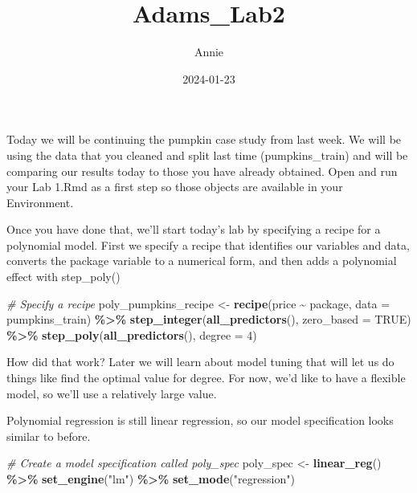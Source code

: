 \documentclass[
]{article}
\title{Adams\_Lab2}
\author{Annie}
\date{2024-01-23}
\newenvironment{Shaded}{\begin{snugshade}}{\end{snugshade}}
\newcommand{\AttributeTok}[1]{\textcolor[rgb]{0.13,0.29,0.53}{#1}}
\newcommand{\CommentTok}[1]{\textcolor[rgb]{0.56,0.35,0.01}{\textit{#1}}}
\newcommand{\ConstantTok}[1]{\textcolor[rgb]{0.56,0.35,0.01}{#1}}
\newcommand{\DecValTok}[1]{\textcolor[rgb]{0.00,0.00,0.81}{#1}}
\newcommand{\FunctionTok}[1]{\textcolor[rgb]{0.13,0.29,0.53}{\textbf{#1}}}
\newcommand{\NormalTok}[1]{#1}
\newcommand{\OtherTok}[1]{\textcolor[rgb]{0.56,0.35,0.01}{#1}}
\newcommand{\SpecialCharTok}[1]{\textcolor[rgb]{0.81,0.36,0.00}{\textbf{#1}}}
\newcommand{\StringTok}[1]{\textcolor[rgb]{0.31,0.60,0.02}{#1}}
\begin{document}
\maketitle

Today we will be continuing the pumpkin case study from last week. We
will be using the data that you cleaned and split last time
(pumpkins\_train) and will be comparing our results today to those you
have already obtained. Open and run your Lab 1.Rmd as a first step so
those objects are available in your Environment.

Once you have done that, we'll start today's lab by specifying a recipe
for a polynomial model. First we specify a recipe that identifies our
variables and data, converts the package variable to a numerical form,
and then adds a polynomial effect with step\_poly()

\begin{Shaded}
\begin{Highlighting}[]
\CommentTok{\# Specify a recipe}
\NormalTok{poly\_pumpkins\_recipe }\OtherTok{\textless{}{-}}
  \FunctionTok{recipe}\NormalTok{(price }\SpecialCharTok{\textasciitilde{}}\NormalTok{ package, }\AttributeTok{data =}\NormalTok{ pumpkins\_train) }\SpecialCharTok{\%\textgreater{}\%}
  \FunctionTok{step\_integer}\NormalTok{(}\FunctionTok{all\_predictors}\NormalTok{(), }\AttributeTok{zero\_based =} \ConstantTok{TRUE}\NormalTok{) }\SpecialCharTok{\%\textgreater{}\%} 
  \FunctionTok{step\_poly}\NormalTok{(}\FunctionTok{all\_predictors}\NormalTok{(), }\AttributeTok{degree =} \DecValTok{4}\NormalTok{)}
\end{Highlighting}
\end{Shaded}

How did that work? Later we will learn about model tuning that will let
us do things like find the optimal value for degree. For now, we'd like
to have a flexible model, so we'll use a relatively large value.

Polynomial regression is still linear regression, so our model
specification looks similar to before.

\begin{Shaded}
\begin{Highlighting}[]
\CommentTok{\# Create a model specification called poly\_spec}
\NormalTok{poly\_spec }\OtherTok{\textless{}{-}} \FunctionTok{linear\_reg}\NormalTok{() }\SpecialCharTok{\%\textgreater{}\%} 
  \FunctionTok{set\_engine}\NormalTok{(}\StringTok{"lm"}\NormalTok{) }\SpecialCharTok{\%\textgreater{}\%} 
  \FunctionTok{set\_mode}\NormalTok{(}\StringTok{"regression"}\NormalTok{)}
\end{Highlighting}
\end{Shaded}
\end{document}
